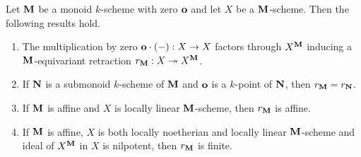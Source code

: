 \begin{proposition}\label{proposition:retraction_for_monoids_with_zero}
Let $\mathbf{M}$ be a monoid $k$-scheme with zero $\mathbf{o}$ and let $X$ be a $\mathbf{M}$-scheme. Then the following results hold.
\begin{enumerate}[label=\emph{\textbf{(\arabic*)}}, leftmargin=3.0em]
\item The multiplication by zero $\mathbf{o}\cdot(-):X\rightarrow X$ factors through $X^{\mathbf{M}}$ inducing a $\mathbf{M}$-equivariant retraction $r_{\mathbf{M}}:X\twoheadrightarrow X^{\mathbf{M}}$.
\item If $\mathbf{N}$ is a submonoid $k$-scheme of $\mathbf{M}$ and $\mathbf{o}$ is a $k$-point of $\mathbf{N}$, then $r_{\mathbf{M}} = r_{\mathbf{N}}$.
\item If $\mathbf{M}$ is affine and $X$ is locally linear $\mathbf{M}$-scheme, then $r_{\mathbf{M}}$ is affine.
\item If $\mathbf{M}$ is affine, $X$ is both locally noetherian and locally linear $\mathbf{M}$-scheme and ideal of $X^{\mathbf{M}}$ in $X$ is nilpotent, then $r_{\mathbf{M}}$ is finite.
\end{enumerate}
\end{proposition}
